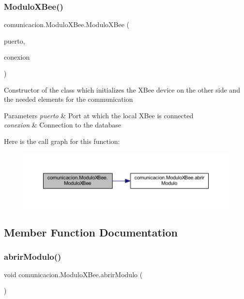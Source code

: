 \subsubsection{\texorpdfstring{Modulo\+X\+Bee()}{ModuloXBee()}}
{\footnotesize\ttfamily comunicacion.\+Modulo\+X\+Bee.\+Modulo\+X\+Bee (\begin{DoxyParamCaption}\item[{String}]{puerto,  }\item[{\mbox{\hyperlink{classconexion_s_q_l_1_1_my_data_access}{My\+Data\+Access}}}]{conexion }\end{DoxyParamCaption})}

Constructor of the class which initializes the X\+Bee device on the other side and the needed elements for the communication 
\begin{DoxyParams}{Parameters}
{\em puerto} & Port at which the local X\+Bee is connected \\
\hline
{\em conexion} & Connection to the database \\
\hline
\end{DoxyParams}
Here is the call graph for this function\+:
\nopagebreak
\begin{figure}[H]
\begin{center}
\leavevmode
\includegraphics[width=350pt]{classcomunicacion_1_1_modulo_x_bee_aaea76284c0f4a44f4223888c9a8b44ea_cgraph}
\end{center}
\end{figure}


\subsection{Member Function Documentation}
\mbox{\label{classcomunicacion_1_1_modulo_x_bee_a2d5ad79e8571f3a2daaf66e3b5df4351}} 
\subsubsection{\texorpdfstring{abrir\+Modulo()}{abrirModulo()}}
{\footnotesize\ttfamily void comunicacion.\+Modulo\+X\+Bee.\+abrir\+Modulo (\begin{DoxyParamCaption}{ }\end{DoxyParamCaption})}

